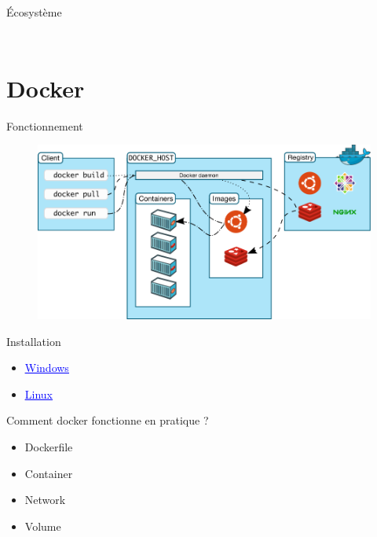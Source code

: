 \documentclass[11pt]{beamer}
\newcommand{\blue}[1]{\textcolor{blue}{#1}}
\begin{document}
\begin{frame}{Écosystème}
\begin{columns}
\begin{column}{0.33\textwidth}
\begin{figure}
		\end{figure}	
	\end{column}
\end{columns}

\end{frame}

\section{Docker}
\begin{frame}{Fonctionnement}
	\begin{figure}
		\includegraphics[scale=0.25]{images/docker_architecture.png}
	\end{figure}
\end{frame}

\begin{frame}{Installation}
	\begin{itemize}
		\item \href{https://docs.docker.com/docker-for-windows/install/}{\blue{\underline{Windows}}}
		\item \href{https://docs.docker.com/engine/install/debian/}{\blue{\underline{Linux}}}
	\end{itemize}
\end{frame}

\begin{frame}{Comment docker fonctionne en pratique ?}
	\begin{itemize}
		\item Dockerfile
		\item Container
		\item Network
		\item Volume
	\end{itemize}
\end{frame}
\end{document}
